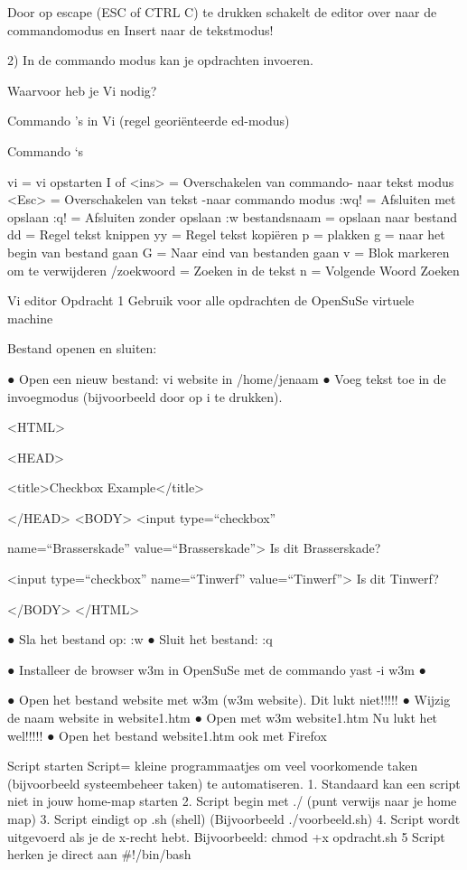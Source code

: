 Door op escape (ESC of CTRL C) te drukken schakelt de editor over 
naar de commandomodus en Insert naar  de tekstmodus!

2) In de commando modus kan je opdrachten invoeren.



Waarvoor heb je Vi  nodig?



Commando 's in Vi (regel 
georiënteerde ed-modus)

Commando ‘s

vi = vi opstarten
I of <ins> = Overschakelen van commando- naar tekst modus
<Esc> = Overschakelen van tekst -naar commando modus
:wq! = Afsluiten met opslaan
:q! = Afsluiten zonder opslaan
:w bestandsnaam = opslaan naar bestand
dd = Regel tekst knippen
yy = Regel tekst kopiëren
p = plakken
g = naar het begin van bestand gaan
G  = Naar eind van bestanden gaan
v = Blok markeren om te verwijderen
/zoekwoord = Zoeken in de tekst
n = Volgende Woord Zoeken



Vi editor Opdracht 1
Gebruik voor alle opdrachten de OpenSuSe virtuele machine

Bestand openen en sluiten:

● Open een nieuw bestand: vi website in /home/jenaam
● Voeg tekst toe in de invoegmodus (bijvoorbeeld door op i te drukken).

      <HTML> 

<HEAD>

<title>Checkbox Example</title> 

</HEAD> 
<BODY> 
<input type=“checkbox”

name=“Brasserskade”
value=“Brasserskade”> Is dit Brasserskade?

<input type=“checkbox”
name=“Tinwerf”
value=“Tinwerf”> Is dit Tinwerf?
     

   </BODY> 
</HTML>      

● Sla het bestand op: :w
● Sluit het bestand: :q



● Installeer de browser w3m in OpenSuSe met de commando yast -i w3m
●

● Open het bestand website met w3m (w3m website). Dit lukt niet!!!!!
● Wijzig de naam website in website1.htm
● Open  met w3m  website1.htm Nu lukt het wel!!!!!
● Open het bestand website1.htm ook met Firefox



Script starten
Script= kleine programmaatjes om veel voorkomende taken 
(bijvoorbeeld systeembeheer taken) te automatiseren.
1. Standaard kan een script niet in jouw home-map starten
2. Script begin met ./     (punt verwijs naar je home map)
3. Script eindigt op .sh (shell) (Bijvoorbeeld ./voorbeeld.sh)
4. Script wordt uitgevoerd als je de x-recht hebt.
    Bijvoorbeeld: chmod +x opdracht.sh
    5 Script herken je direct aan #!/bin/bash



